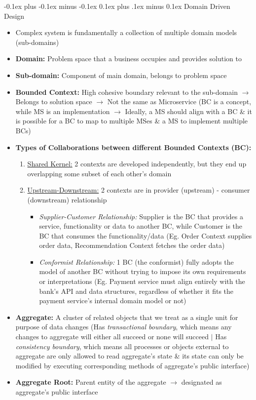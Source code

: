 \documentclass[landscape]{article}
\makeatletter
\renewcommand{\subsection}{\@startsection{subsection}{2}{0mm}%
  {-0.1ex plus -0.1ex minus -0.1ex}%
  {0.1ex plus .1ex minus 0.1ex}%
{\normalfont\scriptsize\bfseries}}
\makeatother
\begin{document}
\begin{multicols*}{5}
    \subsection{Domain Driven Design}
    \begin{itemize}
      \item Complex system is fundamentally a collection of multiple domain models (sub-domains)
      \item\textbf{Domain:} Problem space that a business occupies and provides solution to
      \item \textbf{Sub-domain:} Component of main domain, belongs to problem space
      \item \textbf{Bounded Context:} High cohesive boundary relevant to the sub-domain $\rightarrow$ Belongs to solution space $\rightarrow$ Not the same as Microservice (BC is a concept, while MS is an implementation $\rightarrow$ Ideally, a MS should align with a BC \& it is possible for a BC to map to multiple MSes \& a MS to implement multiple BCs)
      \item \textbf{Types of Collaborations between different Bounded Contexts (BC):}
      \begin{enumerate}
        \item \underline{Shared Kernel:} 2 contexts are developed independently, but they end up overlapping some subset of each other's domain
        \item \underline{Upstream-Downstream:} 2 contexts are in provider (upstream) - consumer (downstream) relationship
        \begin{itemize}
          \item \textit{Supplier-Customer Relationship:} Supplier is the BC that provides a service, functionality or data to another BC, while Customer is the BC that consumes the functionality/data (Eg. Order Context supplies order data, Recommendation Context fetches the order data)
          \item \textit{Conformist Relationship:} 1 BC (the conformist) fully adopts the model of another BC without trying to impose its own requirements or interpretations (Eg. Payment service must align entirely with the bank's API and data structures, regardless of whether it fits the payment service's internal domain model or not)
        \end{itemize}
      \end{enumerate}
      \item \textbf{Aggregate:} A cluster of related objects that we treat as a single unit for purpose of data changes (Has \textit{transactional boundary}, which means any changes to aggregate will either all succeed or none will succeed $|$ Has \textit{consistency boundary}, which means all processes or objects external to aggregate are only allowed to read aggregate's state \& its state can only be modified by executing corresponding methods of aggregate's public interface)
      \item \textbf{Aggregate Root:} Parent entity of the aggregate $\rightarrow$ designated as aggregate's public interface
    \end{itemize}


\end{multicols*}
\end{document}
